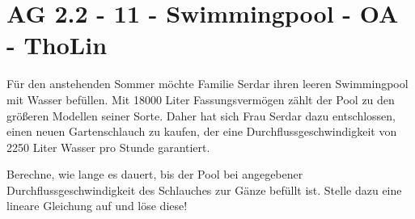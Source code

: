 \section{AG 2.2 - 11 - Swimmingpool - OA - ThoLin}

\begin{beispiel}[AG 2.2]{1}
Für den anstehenden Sommer möchte Familie Serdar ihren leeren Swimmingpool mit Wasser befüllen. Mit 18000 Liter Fassungsvermögen zählt der Pool zu den größeren Modellen seiner Sorte. Daher hat sich Frau Serdar dazu entschlossen, einen neuen Gartenschlauch zu kaufen, der eine Durchflussgeschwindigkeit von 2250 Liter Wasser pro Stunde garantiert.

Berechne, wie lange es dauert, bis der Pool bei angegebener Durchflussgeschwindigkeit des Schlauches zur Gänze befüllt ist. Stelle dazu eine lineare Gleichung auf und löse diese!

\newline
\newline
{}
\end{beispiel}